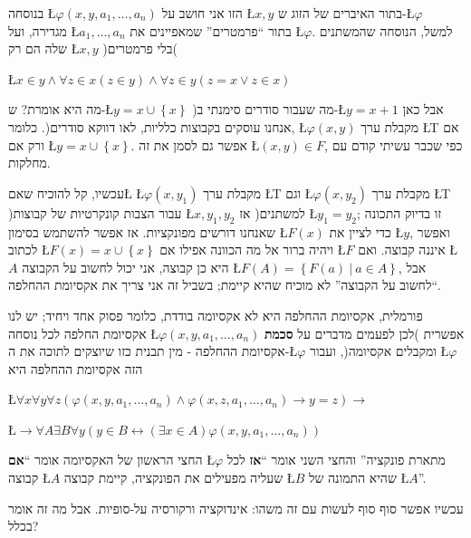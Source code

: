 \documentclass[english,hebrew]{article}
\begin{document}
בנוסחה \L{$\varphi\left(x,y,a_{1},\ldots,a_{n}\right)$} הזו אני חושב
על \L{$x,y$} בתור האיברים של הזוג ש-\L{$\varphi$} מגדירה, ועל \L{$a_{1},\ldots,a_{n}$}
בתור \textquotedblleft פרמטרים\textquotedblright{} שמאפיינים את \L{$\varphi$}.
למשל, הנוסחה שהמשתנים שלה הם רק \L{$x,y$} )בלי פרמטרים(

\L{$x\in y\wedge\forall z\in x\left(z\in y\right)\wedge\forall z\in y\left(z=x\vee z\in x\right)$}

מה היא אומרת? ש-\L{$y=x\cup\left\{ x\right\} $} )מה שעבור סודרים
סימנתי ב-\L{$y=x+1$} אבל כאן אנחנו עוסקים בקבוצות כלליות, לאו דווקא
סודרים(. כלומר, \L{$\varphi\left(x,y\right)$} מקבלת ערך \L{T} אם
ורק אם \L{$y=x\cup\left\{ x\right\} $}. אפשר גם לסמן את זה \L{$\left(x,y\right)\in F$},
כפי שכבר עשיתי קודם עם מחלקות.

עכשיו, קל להוכיח שאם\L{ }\L{$\varphi\left(x,y_{1}\right)$} מקבלת
ערך \L{T} וגם \L{$\varphi\left(x,y_{2}\right)$} מקבלת ערך \L{T} )עבור
הצבות קונקרטיות של קבוצות \L{$x,y_{1},y_{2}$} למשתנים( אז \L{$y_{1}=y_{2}$};
זו בדיוק התכונה שאנחנו דורשים מפונקציות. אז אפשר להשתמש בסימון \L{$F\left(x\right)$}
כדי לציין את \L{$y$}, ואפשר לכתוב \L{$F\left(x\right)=x\cup\left\{ x\right\} $}
ויהיה ברור אל מה הכוונה אפילו אם \L{$F$} איננה קבוצה. ואם \L{$A$}
היא כן קבוצה, אני יכול לחשוב על הקבוצה \L{$F\left(A\right)=\left\{ F\left(a\right)\ |\ a\in A\right\} $},
אבל \textquotedblleft לחשוב על הקבוצה\textquotedblright{} לא מוכיח
שהיא קיימת; בשביל זה אני צריך את אקסיומת ההחלפה.

פורמלית, אקסיומת ההחלפה היא לא אקסיומה בודדת, כלומר פסוק אחד ויחיד;
יש לנו אקסיומת החלפה לכל נוסחה \L{$\varphi\left(x,y,a_{1},\ldots,a_{n}\right)$}
אפשרית )לכן לפעמים מדברים על \textbf{סכמת} אקסיומת ההחלפה - מין תבנית
כזו שיוצקים לתוכה את ה-\L{$\varphi$} ומקבלים אקסיומה(, ועבור \L{$\varphi$}
הזה אקסיומת ההחלפה היא

\L{$\forall x\forall y\forall z\left(\varphi\left(x,y,a_{1},\ldots,a_{n}\right)\wedge\varphi\left(x,z,a_{1},\ldots,a_{n}\right)\to y=z\right)\to$}

\L{$\to\forall A\exists B\forall y\left(y\in B\leftrightarrow\left(\exists x\in A\right)\varphi\left(x,y,a_{1},\ldots,a_{n}\right)\right)$}

החצי הראשון של האקסיומה אומר \textquotedblleft\textbf{אם} \L{$\varphi$}
מתארת פונקציה\textquotedblright{} והחצי השני אומר \textquotedblleft\textbf{אז}
לכל קבוצה \L{$A$} שעליה מפעילים את הפונקציה, קיימת קבוצה \L{$B$}
שהיא התמונה של \L{$A$}\textquotedblright .

עכשיו אפשר סוף סוף לעשות עם זה משהו: אינדוקציה ורקורסיה על-סופיות.
אבל מה זה אומר בכלל?
\end{document}
